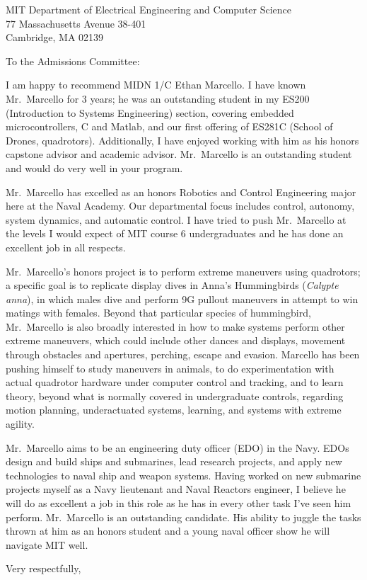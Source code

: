 \documentclass[11pt]{wrceletter}
\date{\today}
\begin{document}
\begin{letter}{%
MIT Department of Electrical Engineering and Computer Science\\
77 Massachusetts Avenue 38-401\\
Cambridge, MA 02139}

\opening{To the Admissions Committee:}
\raggedright %
\setlength{\parindent}{15pt} %

I am happy to recommend MIDN 1/C Ethan Marcello. I have known Mr.~Marcello for 3 years; he was an outstanding student in my ES200 (Introduction to Systems Engineering) section, covering embedded microcontrollers, C and Matlab, and our first offering of ES281C (School of Drones, quadrotors). Additionally, I have enjoyed working with him as his honors capstone advisor and academic advisor. Mr.~Marcello is an outstanding student and would do very well in your program. 

Mr.~Marcello has excelled as an honors Robotics and Control Engineering major here at the Naval Academy. Our departmental focus includes control, autonomy, system dynamics, and automatic control.  I have tried to push Mr.~Marcello at the levels I would expect of MIT course 6 undergraduates and he has done an excellent job in all respects. 

Mr.~Marcello's honors project is to perform extreme maneuvers using quadrotors; a specific goal is to replicate display dives in Anna's Hummingbirds (\emph{Calypte anna}), in which males dive and perform 9G pullout maneuvers in attempt to win matings with females. Beyond that particular species of hummingbird, Mr.~Marcello is also broadly interested in how to make systems perform other extreme maneuvers, which could include other dances and displays, movement through obstacles and apertures, perching, escape and evasion. Marcello has been pushing himself to study maneuvers in animals, to do experimentation with actual quadrotor hardware under computer control and tracking, and to learn theory, beyond what is normally covered in undergraduate controls, regarding motion planning, underactuated systems, learning, and systems with extreme agility. 

Mr.~Marcello aims to be an engineering duty officer (EDO) in the Navy. EDOs design and build ships and submarines, lead research projects, and apply new technologies to naval ship and weapon systems. Having worked on new submarine projects myself as a Navy lieutenant and Naval Reactors engineer, I believe he will do as excellent a job in this role as he has in every other task I've seen him perform. Mr.~Marcello is an outstanding candidate. His ability to juggle the tasks thrown at him as an honors student and a young naval officer show he will navigate MIT well. 

\closing{Very respectfully,} %

\end{letter}
\end{document}
